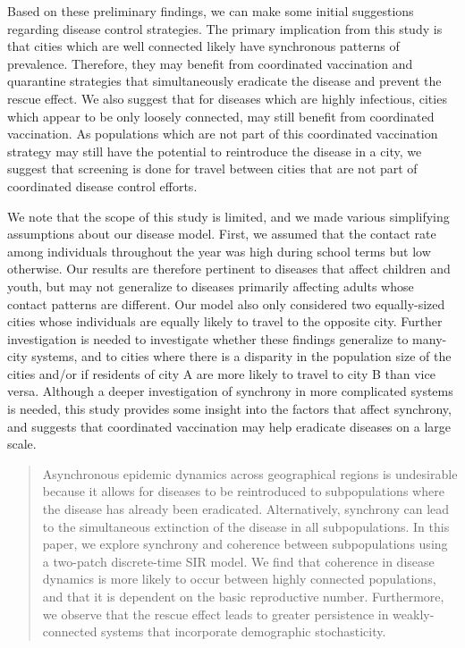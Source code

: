 \documentclass[12pt]{article}
\begin{document}
Based on these preliminary findings, we can make some initial suggestions regarding disease control strategies. The primary implication from this study is that cities which are well connected likely have synchronous patterns of prevalence. Therefore, they may benefit from coordinated vaccination and quarantine strategies that simultaneously eradicate the disease and prevent the rescue effect. We also suggest that for diseases which are highly infectious, cities which appear to be only loosely connected, may still benefit from coordinated vaccination. As populations which are not part of this coordinated vaccination strategy may still have the potential to reintroduce the disease in a city, we suggest that screening is done for travel between cities that are not part of coordinated disease control efforts.

We note that the scope of this study is limited, and we made various simplifying assumptions about our disease model. First, we assumed that the contact rate among individuals throughout the year was high during school terms but low otherwise. Our results are therefore pertinent to diseases that affect children and youth, but may not generalize to diseases primarily affecting adults whose contact patterns are different. Our model also only considered two equally-sized cities whose individuals are equally likely to travel to the opposite city. Further investigation is needed to investigate whether these findings generalize to many-city systems, and to cities where there is a disparity in the population size of the cities and/or if residents of city A are more likely to travel to city B than vice versa. Although a deeper investigation of synchrony in more complicated systems is needed, this study provides some insight into the factors that affect synchrony, and suggests that coordinated vaccination may help eradicate diseases on a large scale.
\newpage

\begin{abstract}
Asynchronous epidemic dynamics across geographical regions is undesirable because it allows for diseases to be reintroduced to subpopulations where the disease has already been eradicated. Alternatively, synchrony can lead to the simultaneous extinction of the disease in all subpopulations.
In this paper, we explore synchrony and coherence between subpopulations using a two-patch discrete-time SIR model.
We find that coherence in disease dynamics is more likely to occur between highly connected populations, and that it is dependent on the basic reproductive number. 
Furthermore, we observe that the rescue effect leads to greater persistence in weakly-connected systems that incorporate demographic stochasticity.  
\end{abstract}
\end{document}
